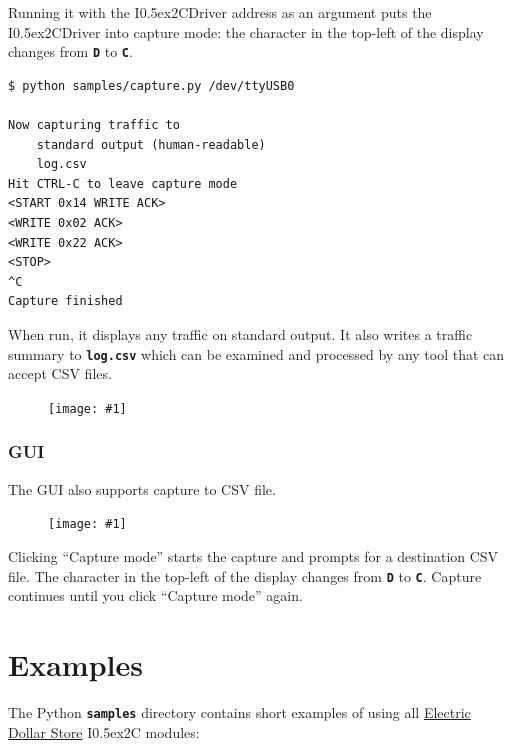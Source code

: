 \documentclass{article}
\newcommand{\two}{\raise0.5ex\hbox{\footnotesize{2}}}
\newcommand{\iic}{I\two{}C}
\newcommand{\iicdriver}{I\two{}CDriver}
\newcommand{\png}[1]{
\begin{figure}[H]
\begin{center}
\texttt{[image: \#1]}
\end{center}
\end{figure}
}
\newcommand{\mach}[1]{\texttt{\textbf{#1}}}
\newcommand{\gap}{\vspace{10pt}}
\begin{document}
Running it with the \iicdriver{} address as an argument puts the \iicdriver{} into capture mode:
the character in the top-left of the display changes from \mach{D} to \mach{C}.

\begin{lstlisting}
$ python samples/capture.py /dev/ttyUSB0

Now capturing traffic to
    standard output (human-readable)
    log.csv
Hit CTRL-C to leave capture mode
<START 0x14 WRITE ACK>
<WRITE 0x02 ACK>
<WRITE 0x22 ACK>
<STOP>
^C
Capture finished
\end{lstlisting}

When run, it displays any traffic on standard output.
It also writes a traffic summary to \mach{log.csv} which
can be examined and processed by any tool that can accept CSV files.

\png{img/i2cdriver/csv}

\subsubsection{GUI}

The GUI also supports capture to CSV file.

\png{img/i2cdriver/win32-gui-capture}

Clicking ``Capture mode'' starts the capture
and prompts for a destination CSV file.
The character in the top-left of the display changes from \mach{D} to \mach{C}.
Capture continues until you click ``Capture mode'' again.

\newpage
\section{Examples}

The Python \mach{samples} directory contains short examples of using all
\href{https://electricdollarstore.com}{Electric Dollar Store} \iic{} modules:\gap
\end{document}
